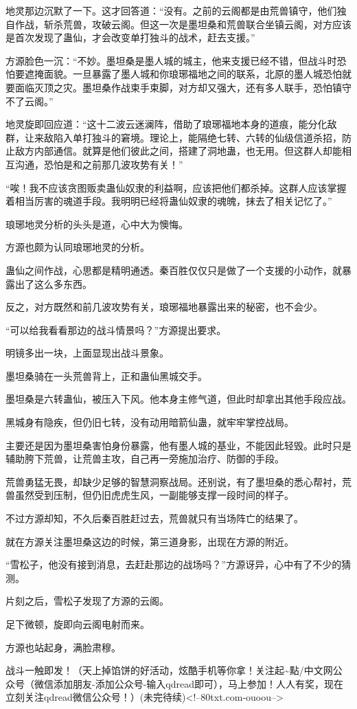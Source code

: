\begin{this_body}
地灵那边沉默了一下。这才回答道：“没有。之前的云阁都是由荒兽镇守，他们独自作战，斩杀荒兽，攻破云阁。但这一次是墨坦桑和荒兽联合坐镇云阁，对方应该是首次发现了蛊仙，才会改变单打独斗的战术，赶去支援。”

方源脸色一沉：“不妙。墨坦桑是墨人城的城主，他来支援已经不错，但战斗时恐怕要遮掩面貌。一旦暴露了墨人城和你琅琊福地之间的联系，北原的墨人城恐怕就要面临灭顶之灾。墨坦桑作战束手束脚，对方却又强大，还有多人联手，恐怕镇守不了云阁。”

地灵旋即回应道：“这十二波云迷澜阵，借助了琅琊福地本身的道痕，能分化敌群，让来敌陷入单打独斗的窘境。理论上，能隔绝七转、六转的仙级信道杀招，防止敌方内部通信。就算是他们彼此之间，搭建了洞地蛊，也无用。但这群人却能相互沟通，恐怕是和之前那几波攻势有关！”

“唉！我不应该贪图贩卖蛊仙奴隶的利益啊，应该把他们都杀掉。这群人应该掌握着相当厉害的魂道手段。我明明已经将蛊仙奴隶的魂魄，抹去了相关记忆了。”

琅琊地灵分析的头头是道，心中大为懊悔。

方源也颇为认同琅琊地灵的分析。

蛊仙之间作战，心思都是精明通透。秦百胜仅仅只是做了一个支援的小动作，就暴露出了这么多东西。

反之，对方既然和前几波攻势有关，琅琊福地暴露出来的秘密，也不会少。

“可以给我看看那边的战斗情景吗？”方源提出要求。

明镜多出一块，上面显现出战斗景象。

墨坦桑骑在一头荒兽背上，正和蛊仙黑城交手。

墨坦桑是六转蛊仙，被压入下风。他本身主修气道，但此时却拿出其他手段应战。

黑城身有隐疾，但仍旧七转，没有动用暗箭仙蛊，就牢牢掌控战局。

主要还是因为墨坦桑害怕身份暴露，他有墨人城的基业，不能因此轻毁。此时只是辅助胯下荒兽，让荒兽主攻，自己再一旁施加治疗、防御的手段。

荒兽勇猛无畏，却缺少足够的智慧洞察战局。还别说，有了墨坦桑的悉心帮衬，荒兽虽然受到压制，但仍旧虎虎生风，一副能够支撑一段时间的样子。

不过方源却知，不久后秦百胜赶过去，荒兽就只有当场阵亡的结果了。

就在方源关注墨坦桑这边的时候，第三道身影，出现在方源的附近。

“雪松子，他没有接到消息，去赶赴那边的战场吗？”方源讶异，心中有了不少的猜测。

片刻之后，雪松子发现了方源的云阁。

足下微顿，旋即向云阁电射而来。

方源也站起身，满脸肃穆。

战斗一触即发！（天上掉馅饼的好活动，炫酷手机等你拿！关注起\~{}點/中文网公众号（微信添加朋友-添加公众号-输入qdread即可），马上参加！人人有奖，现在立刻关注qdread微信公众号！）(未完待续)<!--80txt.com-ouoou-->

\end{this_body}

